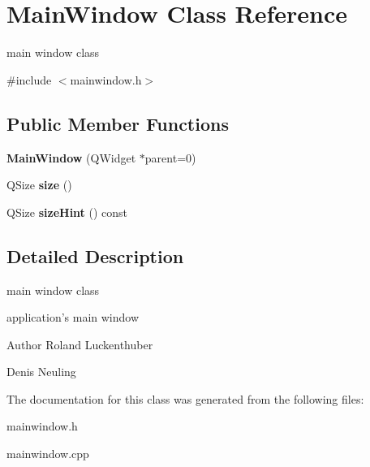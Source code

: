 \hypertarget{classMainWindow}{\section{\-Main\-Window \-Class \-Reference}
\label{classMainWindow}
}


main window class  




{\ttfamily \#include $<$mainwindow.\-h$>$}

\subsection*{\-Public \-Member \-Functions}
\begin{DoxyCompactItemize}
\item 
\hypertarget{classMainWindow_a8b244be8b7b7db1b08de2a2acb9409db}{{\bfseries \-Main\-Window} (\-Q\-Widget $\ast$parent=0)}\label{classMainWindow_a8b244be8b7b7db1b08de2a2acb9409db}

\item 
\hypertarget{classMainWindow_af747387b0953cbb422b3cb52031b863c}{\-Q\-Size {\bfseries size} ()}\label{classMainWindow_af747387b0953cbb422b3cb52031b863c}

\item 
\hypertarget{classMainWindow_a781737f6e3b1f3e97e6a7eebb6396771}{\-Q\-Size {\bfseries size\-Hint} () const }\label{classMainWindow_a781737f6e3b1f3e97e6a7eebb6396771}

\end{DoxyCompactItemize}


\subsection{\-Detailed \-Description}
main window class 

application's main window

\begin{DoxyAuthor}{\-Author}
\-Roland \-Luckenthuber 

\-Denis \-Neuling 
\end{DoxyAuthor}


\-The documentation for this class was generated from the following files\-:\begin{DoxyCompactItemize}
\item 
mainwindow.\-h\item 
mainwindow.\-cpp\end{DoxyCompactItemize}
